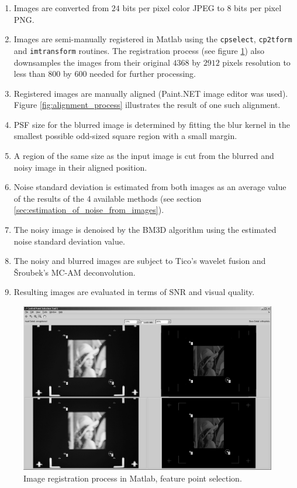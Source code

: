\documentclass[12pt,notitlepage]{report}
\begin{document}
\begin{enumerate}
\item Images are converted from $24$ bits per pixel color JPEG to $8$ bits per pixel PNG.
\item Images are semi-manually registered in Matlab using the \texttt{cpselect}, \texttt{cp2tform} and \texttt{imtransform} routines. The registration process (see figure \ref{fig:registration_process}) also downsamples the images from their original $4368$ by $2912$ pixels resolution to less than $800$ by $600$ needed for further processing. 
\item Registered images are manually aligned (Paint.NET image editor was used). Figure \ref{fig:alignment_process} illustrates the result of one such alignment.
\item PSF size for the blurred image is determined by fitting the blur kernel in the smallest possible odd-sized square region with a small margin.
\item A region of the same size as the input image is cut from the blurred and noisy image in their aligned position.
\item Noise standard deviation is estimated from both images as an average value of the results of the 4 available methods (see section \ref{sec:estimation_of_noise_from_images}).
\item The noisy image is denoised by the BM3D algorithm using the estimated noise standard deviation value.
\item The noisy and blurred images are subject to Tico's wavelet fusion and Šroubek's MC-AM deconvolution.
\item Resulting images are evaluated in terms of SNR and visual quality.
\end{enumerate}

\begin{figure}[htb]
 \centering
  \includegraphics[width=12cm]{registration_process.png}
 \caption{Image registration process in Matlab, feature point selection.}
 \label{fig:registration_process}
\end{figure}
\end{document}
